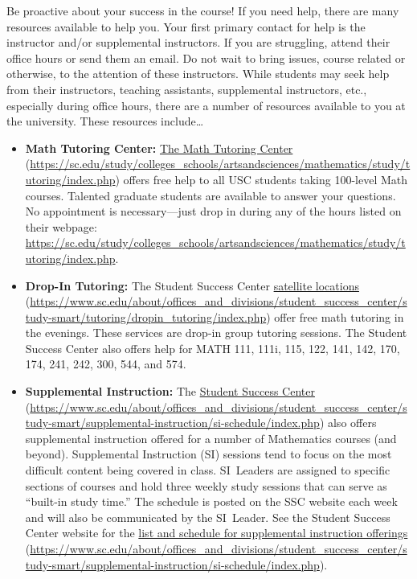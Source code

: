 \documentclass[11pt,letterpaper]{article}
\begin{document}
Be proactive about your success in the course! If you need help, there are many resources available to help you. Your first primary contact for help is the instructor and/or supplemental instructors. If you are struggling, attend their office hours or send them an email. Do not wait to bring issues, course related or otherwise, to the attention of these instructors. While students may seek help from their instructors, teaching assistants, supplemental instructors, etc., especially during office hours, there are a number of resources available to you at the university. These resources include\dots
	\begin{itemize}
	\item {\bfseries Math Tutoring Center:} \href{https://sc.edu/study/colleges\_schools/artsandsciences/mathematics/study/tutoring/index.php}{The Math Tutoring Center} (\url{https://sc.edu/study/colleges\_schools/artsandsciences/mathematics/study/tutoring/index.php}) offers free help to all USC students taking 100-level Math courses. Talented graduate students are available to answer your questions. No appointment is necessary---just drop in during any of the hours listed on their webpage: \url{https://sc.edu/study/colleges\_schools/artsandsciences/mathematics/study/tutoring/index.php}. 
	
	\item {\bfseries Drop-In Tutoring:} The Student Success Center \href{https://www.sc.edu/about/offices\_and\_divisions/student\_success\_center/study-smart/tutoring/dropin\_tutoring/index.php}{satellite locations} (\url{https://www.sc.edu/about/offices\_and\_divisions/student\_success\_center/study-smart/tutoring/dropin\_tutoring/index.php}) offer free math tutoring in the evenings. These services are drop-in group tutoring sessions. The Student Success Center also offers help for MATH 111, 111i, 115, 122, 141, 142, 170, 174, 241, 242, 300, 544, and 574. 
	
	\item {\bfseries Supplemental Instruction:} The \href{https://www.sc.edu/about/offices\_and\_divisions/student\_success\_center/study-smart/supplemental-instruction/si-schedule/index.php}{Student Success Center} (\url{https://www.sc.edu/about/offices\_and\_divisions/student\_success\_center/study-smart/supplemental-instruction/si-schedule/index.php}) also offers supplemental instruction offered for a number of Mathematics courses (and beyond). Supplemental Instruction (SI) sessions tend to focus on the most difficult content being covered in class. SI~Leaders are assigned to specific sections of courses and hold three weekly study sessions that can serve as ``built-in study time.'' The schedule is posted on the SSC website each week and will also be communicated by the SI~Leader. See the Student Success Center website for the \href{https://www.sc.edu/about/offices\_and\_divisions/student\_success\_center/study-smart/supplemental-instruction/si-schedule/index.php}{list and schedule for supplemental instruction offerings} (\url{https://www.sc.edu/about/offices\_and\_divisions/student\_success\_center/study-smart/supplemental-instruction/si-schedule/index.php}).
		

\end{itemize}
\end{document}

